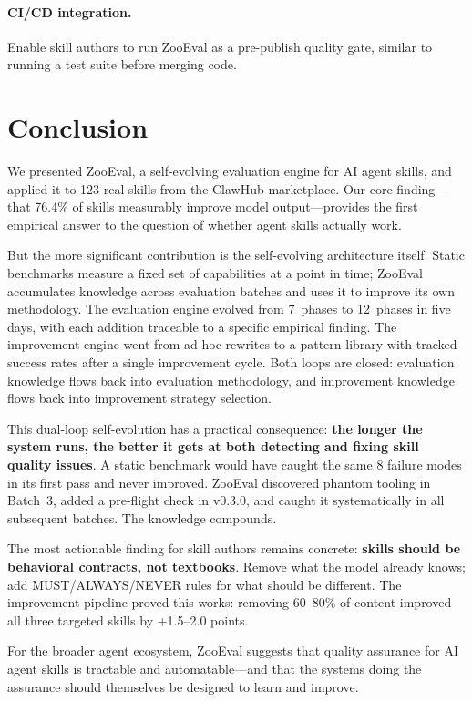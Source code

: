 \documentclass[11pt,a4paper]{article}
\begin{document}
\paragraph{CI/CD integration.}
Enable skill authors to run ZooEval as a pre-publish quality gate, similar to running a test suite before merging code.

\section{Conclusion}
\label{sec:conclusion}

We presented ZooEval, a self-evolving evaluation engine for AI agent skills, and applied it to 123 real skills from the ClawHub marketplace. Our core finding---that 76.4\% of skills measurably improve model output---provides the first empirical answer to the question of whether agent skills actually work.

But the more significant contribution is the self-evolving architecture itself. Static benchmarks measure a fixed set of capabilities at a point in time; ZooEval accumulates knowledge across evaluation batches and uses it to improve its own methodology. The evaluation engine evolved from 7~phases to 12~phases in five days, with each addition traceable to a specific empirical finding. The improvement engine went from ad hoc rewrites to a pattern library with tracked success rates after a single improvement cycle. Both loops are closed: evaluation knowledge flows back into evaluation methodology, and improvement knowledge flows back into improvement strategy selection.

This dual-loop self-evolution has a practical consequence: \textbf{the longer the system runs, the better it gets at both detecting and fixing skill quality issues}. A static benchmark would have caught the same 8 failure modes in its first pass and never improved. ZooEval discovered phantom tooling in Batch~3, added a pre-flight check in v0.3.0, and caught it systematically in all subsequent batches. The knowledge compounds.

The most actionable finding for skill authors remains concrete: \textbf{skills should be behavioral contracts, not textbooks}. Remove what the model already knows; add MUST/ALWAYS/NEVER rules for what should be different. The improvement pipeline proved this works: removing 60--80\% of content improved all three targeted skills by +1.5--2.0 points.

For the broader agent ecosystem, ZooEval suggests that quality assurance for AI agent skills is tractable and automatable---and that the systems doing the assurance should themselves be designed to learn and improve.
\end{document}
